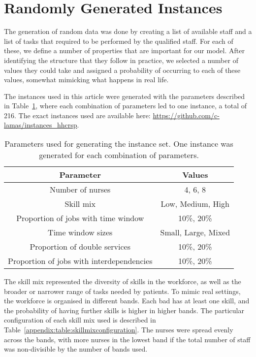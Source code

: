\section{Randomly Generated Instances}
\label{appendix:randomlygenerateddata}
\noindent The generation of random data was done by creating a list of available staff and a list of tasks that required to be performed by the qualified staff. 
For each of these, we define a number of properties that are important for our model. After identifying the structure that they follow in practice, we selected a number of values they could take and assigned a probability of occurring to each of these values, somewhat mimicking what happens in real life.

The instances used in this article were generated with the parameters described in Table~\ref{appendix:table:instancedescription}, where each combination of parameters led to one instance, a total of 216. The exact instances used are available here: \url{https://github.com/c-lamas/instances_hhcrsp}.

\begin{table}[htbp!]
	\caption{Parameters used for generating the instance set. One instance was generated for each combination of parameters.}
	\centering
	\begin{tabular}{|c|c|}
		\hline
		\textbf{Parameter} & \textbf{Values} \\ \hline
		Number of nurses   &  4, 6, 8\\ \hline
		Skill mix   &  Low, Medium, High				   \\ \hline
		Proportion of jobs with time window & 10\%, 20\%\\ \hline
		Time window sizes & Small, Large, Mixed \\ \hline
		Proportion of double services & 10\%, 20\%\\ \hline
		Proportion of jobs with interdependencies & 10\%, 20\%\\ \hline
	\end{tabular}\label{appendix:table:instancedescription}
\end{table}

\noindent The skill mix represented the diversity of skills in the workforce, as well as the broader or narrower range of tasks needed by patients. To mimic real settings, the workforce is organised in different bands. Each bad has at least one skill, and the probability of having further skills is higher in higher bands. The particular configuration of each skill mix used is described in Table~\ref{appendix:table:skillmixconfiguration}. The nurses were spread evenly across the bands, with more nurses in the lowest band if the total number of staff was non-divisible by the number of bands used.

